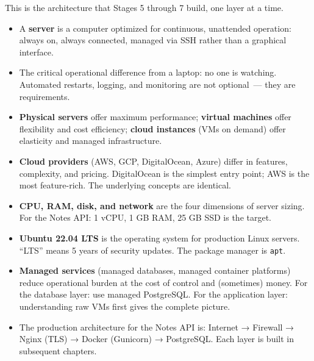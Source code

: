 \noindent{}This is the architecture that Stages 5 through 7 build, one layer at a time.

\label{20-server-fundamentals:key-takeaways}
\begin{takeaways}

\begin{itemize}
\tightlist
\item
  A \textbf{server} is a computer optimized for continuous, unattended operation: always on, always connected, managed via SSH rather than a graphical interface.
\item
  The critical operational difference from a laptop: no one is watching. Automated restarts, logging, and monitoring are not optional~--- they are requirements.
\item
  \textbf{Physical servers} offer maximum performance; \textbf{virtual machines} offer flexibility and cost efficiency; \textbf{cloud instances} (VMs on demand) offer elasticity and managed infrastructure.
\item
  \textbf{Cloud providers} (AWS, GCP, DigitalOcean, Azure) differ in features, complexity, and pricing. DigitalOcean is the simplest entry point; AWS is the most feature-rich. The underlying concepts are identical.
\item
  \textbf{CPU, RAM, disk, and network} are the four dimensions of server sizing. For the Notes API: 1 vCPU, 1 GB RAM, 25 GB SSD is the target.
\item
  \textbf{Ubuntu 22.04 LTS} is the operating system for production Linux servers. ``LTS'' means 5 years of security updates. The package manager is \texttt{apt}.
\item
  \textbf{Managed services} (managed databases, managed container platforms) reduce operational burden at the cost of control and (sometimes) money. For the database layer: use managed PostgreSQL. For the application layer: understanding raw VMs first gives the complete picture.
\item
  The production architecture for the Notes API is: Internet → Firewall → Nginx (TLS) → Docker (Gunicorn) → PostgreSQL. Each layer is built in subsequent chapters.
\end{itemize}

\end{takeaways}

\label{20-server-fundamentals:exercises}

